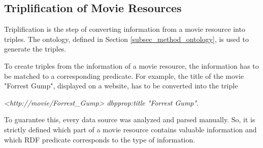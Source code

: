 \subsection{Triplification of Movie Resources}
\label{subsec_method_triplification}

Triplification is the step of converting information from a movie resource into triples.
The ontology, defined in Section \ref{subsec_method_ontology}, is used to generate the triples.

To create triples from the information of a movie resource, the information has to be matched to a corresponding predicate.
For example, the title of the movie "Forrest Gump", displayed on a website, has to be converted into the triple
\begin{center}\emph{<http://movie/Forrest\_Gump> dbpprop:title "Forrest Gump"}.\end{center}
To guarantee this, every data source was analyzed and parsed manually.
So, it is strictly defined which part of a movie resource contains valuable information and which RDF predicate corresponds to the type of information.